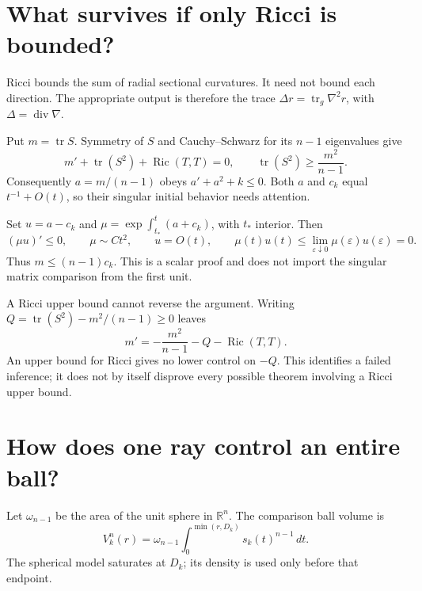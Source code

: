 \documentclass[12pt,reqno]{amsart}
\begin{document}
\section{What survives if only Ricci is bounded?}
\label{sec:laplacian}

Ricci bounds the sum of radial sectional curvatures. It need not bound each direction. The appropriate output is therefore the trace \(\Delta r=\operatorname{tr}_g\nabla^2r\), with \(\Delta=\operatorname{div}\nabla\).

\begin{samepage}
\begin{theorem}
\label{thm:laplacian}

\end{theorem}
\end{samepage}

Put \(m=\operatorname{tr}S\). Symmetry of \(S\) and Cauchy--Schwarz for its \(n-1\) eigenvalues give
\[
m'+\operatorname{tr}(S^2)+\operatorname{Ric}(T,T)=0,
\qquad \operatorname{tr}(S^2)\ge\frac{m^2}{n-1}.
\]
Consequently \(a=m/(n-1)\) obeys \(a'+a^2+k\le0\). Both \(a\) and \(c_k\) equal \(t^{-1}+O(t)\), so their singular initial behavior needs attention.

Set \(u=a-c_k\) and \(\mu=\exp\int_{t_*}^t(a+c_k)\), with \(t_*\) interior. Then
\[
(\mu u)'\le0,\qquad \mu\sim Ct^2,\qquad u=O(t),
\qquad \mu(t)u(t)\le\lim_{\varepsilon\downarrow0}\mu(\varepsilon)u(\varepsilon)=0.
\]
Thus \(m\le(n-1)c_k\). This is a scalar proof and does not import the singular matrix comparison from the first unit.

A Ricci upper bound cannot reverse the argument. Writing \(Q=\operatorname{tr}(S^2)-m^2/(n-1)\ge0\) leaves
\[
m'=-\frac{m^2}{n-1}-Q-\operatorname{Ric}(T,T).
\]
An upper bound for Ricci gives no lower control on \(-Q\). This identifies a failed inference; it does not by itself disprove every possible theorem involving a Ricci upper bound.

\section{How does one ray control an entire ball?}
\label{sec:volume}

Let \(\omega_{n-1}\) be the area of the unit sphere in \(\mathbb R^n\). The comparison ball volume is
\[
V_k^n(r)=\omega_{n-1}\int_0^{\min(r,D_k)}s_k(t)^{n-1}\,dt.
\]
The spherical model saturates at \(D_k\); its density is used only before that endpoint.
\end{document}
